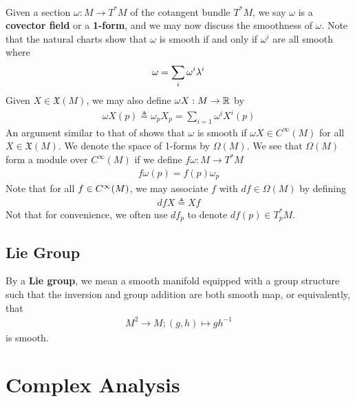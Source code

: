 \documentclass{report}
\begin{document}
\begin{mdframed}
\begin{align*}
\end{align*}
Given a section $\omega:M\rightarrow  T^*M$ of the cotangent bundle $T^*M$, we say  $\omega$ is a \textbf{covector field} or a \textbf{1-form}, and we may now discuss the smoothness of $\omega$. Note that the natural charts show that $\omega$ is smooth if and only if $\omega^i$ are all smooth where 
\begin{align*}
\omega= \sum_i \omega^i \lambda^i
\end{align*}
Given $X \in \mathfrak{X}(M)$, we may also define $\omega X:M\rightarrow \mathbb{R}$ by 
\begin{align*}
\omega X(p)\triangleq \omega_p X_p= \sum_{i=1} \omega^i X^i(p)
\end{align*}
An argument similar to that of  shows that $\omega$ is smooth if $\omega X \in C^{\infty}(M)$ for all $X\in \mathfrak{X}(M)$. We denote the space of 1-forms by $\Omega (M)$. We see that $\Omega (M)$ form a module over $C^{\infty}(M)$ if we define $f\omega: M\rightarrow T^*M$ 
\begin{align*}
f\omega (p)=f(p)\omega_p
\end{align*}
Note that for all $f\in C^{\infty}(M)$, we may associate $f$ with $df \in \Omega (M)$ by defining 
\begin{align*}
dfX\triangleq Xf
\end{align*}
Not that for convenience, we often use $df_p$ to denote  $df(p)\in T_p^*M$. 
\end{mdframed}
\section{Lie Group}
\begin{mdframed}
By a \textbf{Lie group}, we mean a smooth manifold equipped with a group structure such that the inversion and group addition are both smooth map, or equivalently, that 
\begin{align*}
M^2\rightarrow  M; (g,h)\mapsto gh^{-1}
\end{align*}
is smooth. 
\end{mdframed}

\chapter{Complex Analysis}
\end{document}
